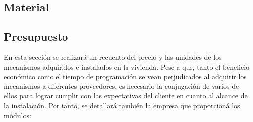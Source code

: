 \subsection{Material}

\subsection{Presupuesto}

En esta sección se realizará un recuento del precio y las unidades de los mecanismos adquiridos e instalados en la vivienda. Pese a que, tanto el beneficio económico como el tiempo de programación se vean perjudicados al adquirir los mecanismos a diferentes proveedores, es necesario la conjugación de varios de ellos para lograr cumplir con las expectativas del cliente en cuanto al alcance de la instalación. Por tanto, se detallará también la empresa que proporcioná los módulos:


